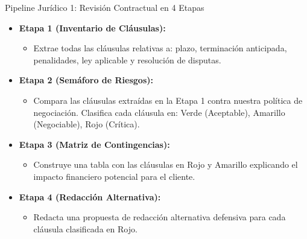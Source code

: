 \documentclass[aspectratio=169]{beamer}
\begin{document}
\begin{frame}{Pipeline Jurídico 1: Revisión Contractual en 4 Etapas}

\begin{itemize}
  \item \textbf{Etapa 1 (Inventario de Cláusulas):}
  \begin{itemize}
    \item Extrae todas las cláusulas relativas a: plazo, terminación anticipada, penalidades, ley aplicable y resolución de disputas.
  \end{itemize}
  \item \textbf{Etapa 2 (Semáforo de Riesgos):}
  \begin{itemize}
    \item Compara las cláusulas extraídas en la Etapa 1 contra nuestra política de negociación. Clasifica cada cláusula en: Verde (Aceptable), Amarillo (Negociable), Rojo (Crítica).
  \end{itemize}
  \item \textbf{Etapa 3 (Matriz de Contingencias):}
  \begin{itemize}
    \item Construye una tabla con las cláusulas en Rojo y Amarillo explicando el impacto financiero potencial para el cliente.
  \end{itemize}
  \item \textbf{Etapa 4 (Redacción Alternativa):}
  \begin{itemize}
    \item Redacta una propuesta de redacción alternativa defensiva para cada cláusula clasificada en Rojo.
  \end{itemize}
\end{itemize}
\end{frame}
\end{document}

